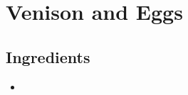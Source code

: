 \thispagestyle{fancy}
\section{Venison and Eggs}
\AddToShipoutPicture*{\SteakAndEggs}

\subsection*{Ingredients}
\begin{multicols}{3}
	\begin{itemize}
		\item 
	\end{itemize}
\end{multicols}
